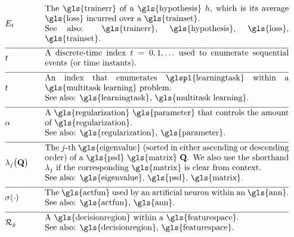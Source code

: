 \begin{align}                          
	&\trainerror &\quad &\parbox{.85\textwidth}{The \gls{trainerr} of a \gls{hypothesis} $\hypothesis$, which is its 
		average \gls{loss} incurred over a \gls{trainset}.
		\\ See also: \gls{trainerr}, \gls{hypothesis}, \gls{loss}, \gls{trainset}. }\nonumber \\[2mm] \hline \nonumber\\[-5mm]
	&\timeidx &\quad &\parbox{.85\textwidth}{A discrete-time index $\timeidx=0, 1, \ldots$ used to 
		enumerate sequential events (or time instants). }\nonumber \\[2mm] \hline \nonumber\\[-5mm]
	&\taskidx &\quad &\parbox{.85\textwidth}{An index that enumerates
		\glspl{learningtask} within a \gls{multitask learning} problem.
		\\ See also: \gls{learningtask}, \gls{multitask learning}. }\nonumber \\[2mm] \hline \nonumber\\[-5mm]
	&\regparam &\quad &\parbox{.85\textwidth}{A \gls{regularization} \gls{parameter} that controls 
		the amount of \gls{regularization}.
		\\ See also: \gls{regularization}, \gls{parameter}. } \nonumber \\[2mm] \hline \nonumber\\[-5mm]
	&\eigval{\featureidx}\big( \mathbf{Q} \big) &\quad &\parbox{.85\textwidth}{The $\featureidx$-th 
		\gls{eigenvalue} (sorted in either ascending or descending order) of a \gls{psd} \gls{matrix} $\mathbf{Q}$. We also 
		use the shorthand $\eigval{\featureidx}$ if the corresponding \gls{matrix} is clear from context.
		\\ See also: \gls{eigenvalue}, \gls{psd}, \gls{matrix}. }\nonumber \\[2mm] \hline \nonumber\\[-5mm]
	&\actfun(\cdot) &\quad &\parbox{.85\textwidth}{The \gls{actfun} used by an artificial neuron within an \gls{ann}.
		\\ See also: \gls{actfun}, \gls{ann}. }\nonumber \\[2mm] \hline \nonumber\\[-5mm]
	&\decreg{\hat{\truelabel}} &\quad &\parbox{.85\textwidth}{A \gls{decisionregion} within a \gls{featurespace}.
		\\ See also: \gls{decisionregion}, \gls{featurespace}. }\nonumber
\end{align}     

